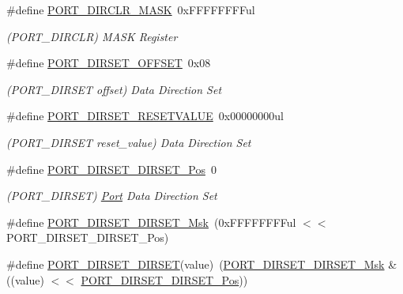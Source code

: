 \begin{DoxyCompactItemize}
\item 
\#define \mbox{\hyperlink{group___s_a_m_d21___p_o_r_t_gaf03d21b4e469df93029d2e6a017c7e9e}{P\+O\+R\+T\+\_\+\+D\+I\+R\+C\+L\+R\+\_\+\+M\+A\+SK}}~0x\+F\+F\+F\+F\+F\+F\+F\+Ful
\begin{DoxyCompactList}\small\item\em (P\+O\+R\+T\+\_\+\+D\+I\+R\+C\+LR) M\+A\+SK Register \end{DoxyCompactList}\item 
\#define \mbox{\hyperlink{group___s_a_m_d21___p_o_r_t_gacbe953a0e93e6e780964524f176fc408}{P\+O\+R\+T\+\_\+\+D\+I\+R\+S\+E\+T\+\_\+\+O\+F\+F\+S\+ET}}~0x08
\begin{DoxyCompactList}\small\item\em (P\+O\+R\+T\+\_\+\+D\+I\+R\+S\+ET offset) Data Direction Set \end{DoxyCompactList}\item 
\#define \mbox{\hyperlink{group___s_a_m_d21___p_o_r_t_gacff4d1ab9a1fe8e242ebd247d5de9c7d}{P\+O\+R\+T\+\_\+\+D\+I\+R\+S\+E\+T\+\_\+\+R\+E\+S\+E\+T\+V\+A\+L\+UE}}~0x00000000ul
\begin{DoxyCompactList}\small\item\em (P\+O\+R\+T\+\_\+\+D\+I\+R\+S\+ET reset\+\_\+value) Data Direction Set \end{DoxyCompactList}\item 
\#define \mbox{\hyperlink{group___s_a_m_d21___p_o_r_t_gaa2c0a845406e6ca4e31556d413108aeb}{P\+O\+R\+T\+\_\+\+D\+I\+R\+S\+E\+T\+\_\+\+D\+I\+R\+S\+E\+T\+\_\+\+Pos}}~0
\begin{DoxyCompactList}\small\item\em (P\+O\+R\+T\+\_\+\+D\+I\+R\+S\+ET) \mbox{\hyperlink{struct_port}{Port}} Data Direction Set \end{DoxyCompactList}\item 
\#define \mbox{\hyperlink{group___s_a_m_d21___p_o_r_t_ga0b4a8e93964c1bedc8f48b0fa037e500}{P\+O\+R\+T\+\_\+\+D\+I\+R\+S\+E\+T\+\_\+\+D\+I\+R\+S\+E\+T\+\_\+\+Msk}}~(0x\+F\+F\+F\+F\+F\+F\+F\+Ful $<$$<$ P\+O\+R\+T\+\_\+\+D\+I\+R\+S\+E\+T\+\_\+\+D\+I\+R\+S\+E\+T\+\_\+\+Pos)
\item 
\#define \mbox{\hyperlink{group___s_a_m_d21___p_o_r_t_ga75a539d2c42e4d5058181a8700b8e9c0}{P\+O\+R\+T\+\_\+\+D\+I\+R\+S\+E\+T\+\_\+\+D\+I\+R\+S\+ET}}(value)~(\mbox{\hyperlink{group___s_a_m_d21___p_o_r_t_ga0b4a8e93964c1bedc8f48b0fa037e500}{P\+O\+R\+T\+\_\+\+D\+I\+R\+S\+E\+T\+\_\+\+D\+I\+R\+S\+E\+T\+\_\+\+Msk}} \& ((value) $<$$<$ \mbox{\hyperlink{group___s_a_m_d21___p_o_r_t_gaa2c0a845406e6ca4e31556d413108aeb}{P\+O\+R\+T\+\_\+\+D\+I\+R\+S\+E\+T\+\_\+\+D\+I\+R\+S\+E\+T\+\_\+\+Pos}}))

\end{DoxyCompactItemize}
